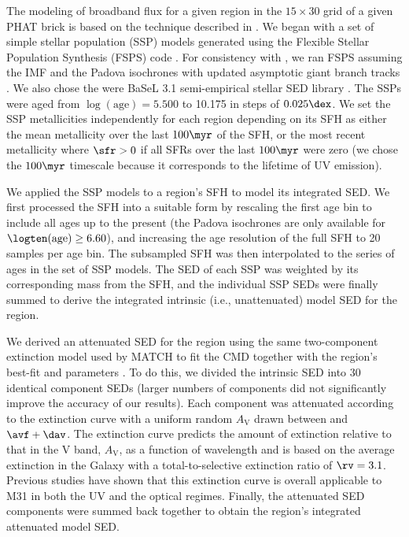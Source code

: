 The modeling of broadband flux for a given region in the $15 \times 30$ grid of
a given PHAT brick is based on the technique described in \citet{Johnson:2013}.
We began with a set of simple stellar population (SSP) models generated using
the Flexible Stellar Population Synthesis (FSPS) code \citep{Conroy:2009,
Conroy:2010}. For consistency with \citet{Lewis:2014}, we ran FSPS assuming the
\citet{Kroupa:2001} IMF and the Padova isochrones \citep{Marigo:2008} with
updated asymptotic giant branch tracks \citep{Girardi:2010}. We also chose the
were BaSeL 3.1 semi-empirical stellar SED library \citep{Westera:2002}. The
SSPs were aged from $\log(\mathrm{age})=5.500$ to 10.175 in steps of
$0.025\dex$. We set the SSP metallicities independently for each region
depending on its SFH as either the mean metallicity over the last $100\myr$ of
the SFH, or the most recent metallicity where $\sfr > 0$ if all SFRs over the
last $100\myr$ were zero (we chose the $100\myr$ timescale because it
corresponds to the lifetime of UV emission).

We applied the SSP models to a region's SFH to model its integrated SED. We
first processed the SFH into a suitable form by rescaling the first age bin to
include all ages up to the present (the Padova isochrones are only available
for $\logten(\mathrm{age}) \ge 6.60$), and increasing the age resolution of the
full SFH to 20 samples per age bin. The subsampled SFH was then interpolated to
the series of ages in the set of SSP models. The SED of each SSP was weighted
by its corresponding mass from the SFH, and the individual SSP SEDs were
finally summed to derive the integrated intrinsic (i.e., unattenuated) model
SED for the region.

We derived an attenuated SED for the region using the same two-component
extinction model used by MATCH to fit the CMD together with the region's
best-fit \avf{} and \dav{} parameters \citep{Lewis:2014}. To do this, we
divided the intrinsic SED into 30 identical component SEDs (larger numbers of
components did not significantly improve the accuracy of our results). Each
component was attenuated according to the \citet{Cardelli:1989} extinction
curve with a uniform random $A_\mathrm{V}$ drawn between \avf{} and $\avf +
\dav$. The \citet{Cardelli:1989} extinction curve predicts the amount of
extinction relative to that in the V band, $A_\mathrm{V}$, as a function of
wavelength and is based on the average extinction in the Galaxy with a
total-to-selective extinction ratio of $\rv = 3.1$. Previous studies have shown
that this extinction curve is overall applicable to M31 in both the UV
\citep{Bianchi:1996} and the optical \citep{Barmby:2000} regimes. Finally, the
attenuated SED components were summed back together to obtain the region's
integrated attenuated model SED.

